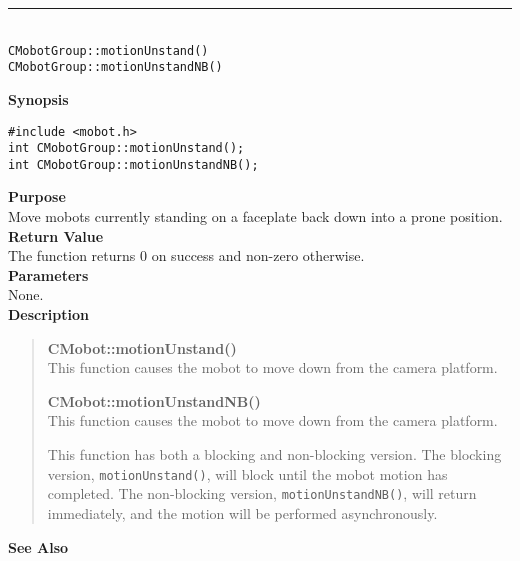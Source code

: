 \noindent
\vspace{5pt}
\rule{4.5in}{0.015in}\\
\noindent
{\LARGE \texttt{CMobotGroup::motionUnstand()}}\\
{\LARGE \texttt{CMobotGroup::motionUnstandNB()}}\\
{}

\noindent
{\bf Synopsis}
\vspace{-8pt}
\begin{verbatim}
#include <mobot.h>
int CMobotGroup::motionUnstand();
int CMobotGroup::motionUnstandNB();
\end{verbatim}

\noindent
{\bf Purpose}\\
Move mobots currently standing on a faceplate back down into a prone position.\\

\noindent
{\bf Return Value}\\
The function returns 0 on success and non-zero otherwise.\\

\noindent
{\bf Parameters}\\
None.\\

\noindent
{\bf Description}\\
\vspace{-12pt}
\begin{quote}
{\bf CMobot::motionUnstand()}\\
This function causes the mobot to move down from the camera platform.

{\bf CMobot::motionUnstandNB()}\\
This function causes the mobot to move down from the camera platform.

This function has both a blocking and non-blocking version.
The blocking version, \texttt{motionUnstand()}, will block until the
mobot motion has completed. The non-blocking version, \texttt{motionUnstandNB()},
will return immediately, and the motion will be performed asynchronously.\\
\end{quote}

\noindent
{\bf See Also}\\

